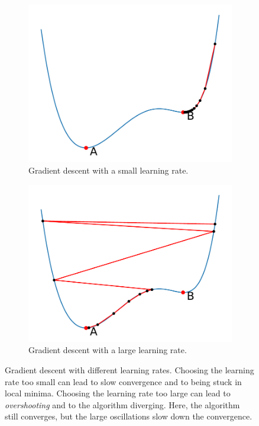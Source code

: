 \begin{figure}
    \centering
    \begin{subfigure}[b]{0.45\textwidth}
        \includegraphics[width=\textwidth]{gradient_descent_small_lr}
        \caption{Gradient descent with a small learning rate.}
        \label{fig:gradient-descent-small}
    \end{subfigure}
    \hfill
    \begin{subfigure}[b]{0.45\textwidth}
        \includegraphics[width=\textwidth]{gradient_descent_large_lr}
        \caption{Gradient descent with a large learning rate.}
        \label{fig:gradient-descent-large}
    \end{subfigure}
    \caption{Gradient descent with different learning rates. Choosing the learning rate too small can lead to slow convergence and to being stuck in local minima. Choosing the learning rate too large can lead to \textit{overshooting} and to the algorithm diverging. Here, the algorithm still converges, but the large oscillations slow down the convergence.}
    \label{fig:gradient-descent}
\end{figure}
